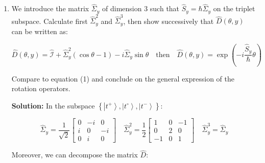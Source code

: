 \documentclass{article}
\begin{document}
\begin{enumerate}
\begin{enumerate}
            \item We introduce the matrix \(\hat{\Sigma}_{y}\) of dimension 3 such that \(\hat{S}_{y} = \hbar \hat{\Sigma}_{y}\) on the triplet subspace. Calculate first \(\hat{\Sigma}_{y}^{2}\) and \(\hat{\Sigma}_{y}^{3}\), then show successively that \(\hat{D}(\theta, y)\) can be written as:

            \[
            \hat{D}(\theta, y) = \hat{\mathcal{I}} + \hat{\Sigma}_{y}^{2} (\cos \theta - 1) - i \hat{\Sigma}_{y} \sin \theta \quad \text{then} \quad \hat{D}(\theta, y) = \exp \left(-i \frac{\hat{S}_{y}}{\hbar} \theta\right)
            \]

            Compare to equation (1) and conclude on the general expression of the rotation operators.

            {\color{red}\textbf{Solution:} In the subspace \(\left\{\left|t^{+}\right\rangle, \left|t^{\circ}\right\rangle, \left|t^{-}\right\rangle\right\}\):

            \[
            \hat{\Sigma}_{y} = \frac{1}{\sqrt{2}} \left[\begin{array}{ccc}
            0 & -i & 0 \\
            i & 0 & -i \\
            0 & i & 0
            \end{array}\right] \quad \hat{\Sigma}_{y}^{2} = \frac{1}{2} \left[\begin{array}{ccc}
            1 & 0 & -1 \\
            0 & 2 & 0 \\
            -1 & 0 & 1
            \end{array}\right] \quad \hat{\Sigma}_{y}^{3} = \hat{\Sigma}_{y}
            \]

            Moreover, we can decompose the matrix \(\hat{D}\):

}
\end{enumerate}
\end{enumerate}
\end{document}
